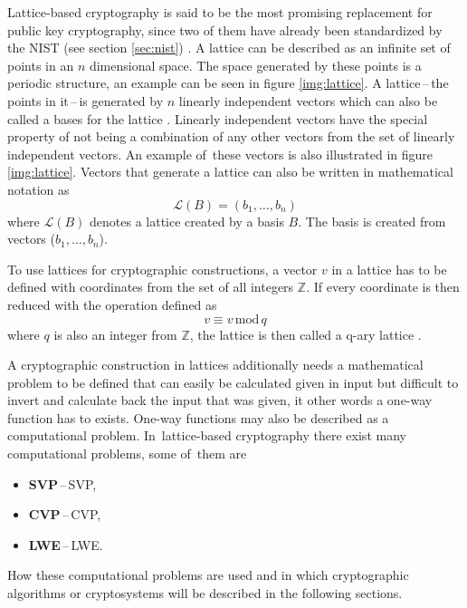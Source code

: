 Lattice-based cryptography is said to be the most promising replacement for public key cryptography, since two of them have already been standardized by the NIST (see section \ref{sec:nist}) \cite{Alagic2022}. A lattice can be described as an infinite set of points in an $n$ dimensional space. The space generated by these points is a periodic structure, an example can be seen in figure \ref{img:lattice}. A lattice\,--\,the points in it\,--\,is generated by $n$ linearly independent vectors which can also be called a bases for the lattice \cite{Ajati1996}. Linearly independent vectors have the special property of not being a combination of any other vectors from the set of linearly independent vectors. An example of~these vectors is also illustrated in figure \ref{img:lattice}. Vectors that generate a lattice can also be written in mathematical notation as
\begin{equation}
  \mathcal{L}(B)=(b_1,\dots,b_n)
\end{equation}
where $\mathcal{L}(B)$ denotes a lattice created by a basis $B$. The basis is created from vectors ($b_1,\dots,b_n$).


To use lattices for cryptographic constructions, a vector $v$ in a lattice has to be defined with coordinates from the set of all integers $\mathbb{Z}$. If every coordinate is then reduced with the operation defined as
\begin{equation}
  v\equiv v\,\mathrm{mod}\,q
\end{equation}
where $q$ is also an integer from $\mathbb{Z}$, the lattice is then called a q-ary lattice \cite{Bernstein2009}.

A cryptographic construction in lattices additionally needs a mathematical problem to be defined that can easily be calculated given in input but difficult to invert and calculate back the input that was given, it other words a one-way function has to exists. One-way functions may also be described as a computational problem. In~lattice-based cryptography there exist many computational problems, some of~them are \cite{Bernstein2009}
\begin{itemize}
  \item \textbf{SVP}\,--\,\acl{SVP},
  \item \textbf{CVP}\,--\,\acl{CVP},
  \item \textbf{LWE}\,--\,\acl{LWE}.
\end{itemize}
How these computational problems are used and in which cryptographic algorithms or cryptosystems will be described in the following sections.
